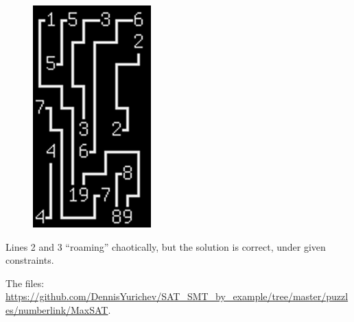 \begin{figure}[H]
\centering
\includegraphics[scale=0.5]{puzzles/numberlink/MaxSAT/SAT.png}
\caption{}
\end{figure}

Lines 2 and 3 ``roaming'' chaotically, but the solution is correct, under given constraints.

The files: \url{https://github.com/DennisYurichev/SAT_SMT_by_example/tree/master/puzzles/numberlink/MaxSAT}.

